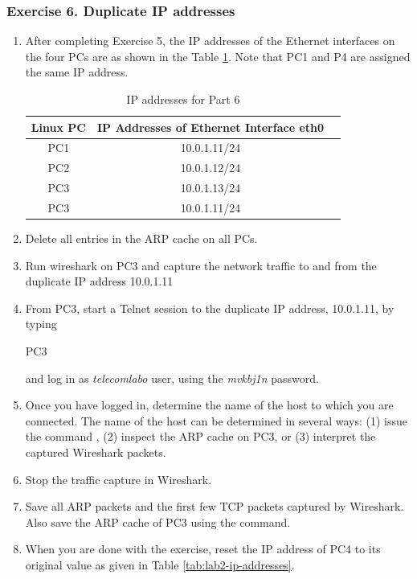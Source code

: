 \subsubsection*{Exercise 6. Duplicate IP addresses}
\begin{enumerate}
	\item After completing Exercise 5, the IP addresses of the Ethernet interfaces on the four PCs are as shown in the Table \ref{tab:lab2-ip-addresses-part-6}. Note that PC1 and P4 are assigned the same IP address.

		\begin{table}[h!t]
			\centering
			\begin{tabular}{| c | c | c |}	
				\hline
				\textbf{Linux PC} & \textbf{IP Addresses of Ethernet Interface eth0}  \\ \hline
				PC1 & 10.0.1.11/24 \\ 
				PC2 & 10.0.1.12/24 \\
				PC3 & 10.0.1.13/24 \\
				PC3 & 10.0.1.11/24 \\ \hline
			\end{tabular}
			\caption{IP addresses for Part 6}
			\label{tab:lab2-ip-addresses-part-6}
		\end{table}
	\item Delete all entries in the ARP cache on all PCs.
	\item Run wireshark on PC3 and capture the network traffic to and from the duplicate IP address 10.0.1.11
	\item From PC3, start a Telnet session to the duplicate IP address, 10.0.1.11, by typing
		\begin{cmdblock}
	PC3%
		\end{cmdblock}
		and log in as \textit{telecomlabo} user, using the \textit{mvkbj1n} password.
	\item Once you have logged in, determine the name of the host to which you are connected. The name of the host can be determined in several ways: (1) issue the command , (2) inspect the ARP cache on PC3, or (3) interpret the captured Wireshark packets.
	\item Stop the traffic capture in Wireshark.
	\item Save all ARP packets and the first few TCP packets captured by Wireshark. Also save the ARP cache of PC3 using the  command.
	\item When you are done with the exercise, reset the IP address of PC4 to its original value as given in Table \ref{tab:lab2-ip-addresses}.
\end{enumerate}

